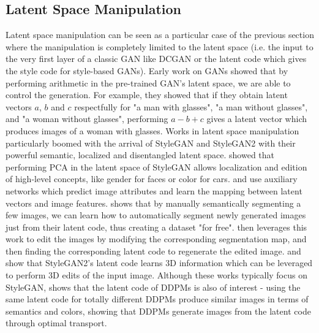 \subsection{Latent Space Manipulation}\label{subsection:latent_space_manipulation}
Latent space manipulation can be seen as a particular case of the previous section where the manipulation 
is completely limited to the latent space (i.e. the input to the very first layer of a classic \ac{GAN}
like \ac{DCGAN} or the latent code which gives the style code for style-based \ac{GAN}s). 
Early work on \ac{GAN}s \citep{dcgan} showed that by performing arithmetic in the pre-trained 
\ac{GAN}'s latent space, we are able to control the generation. For example, they showed that
if they obtain latent vectors $a$, $b$ and $c$ respectfully for "a man with glasses", 
"a man without glasses", and "a woman without glasses", performing $a - b + c$ gives a latent 
vector which produces images of a woman with glasses. Works in latent space manipulation
 particularly boomed with the arrival of StyleGAN \citep{karra2019stylegan}
and StyleGAN2 \citep{karra2020stylegan2} with their powerful semantic, localized and 
disentangled latent space. \cite{harkonen2020ganspace} showed that performing PCA in the 
latent space of 
StyleGAN allows localization and edition of high-level concepts, like gender for faces or 
color for cars. \cite{shen2020interfacegan} and \cite{zhuang2021enjoy} use auxiliary networks 
which predict image attributes and learn the mapping between latent vectors and image features. \cite{zhang2021datasetgan}
shows that by manually semantically segmenting a few images, we can learn how to automatically 
segment newly generated images just from their latent code, thus creating a dataset "for free".
 \cite{ling2021editgan} then leverages this work to edit 
the images by modifying the corresponding segmentation map, and then finding the corresponding latent code to regenerate 
the edited image. \cite{tewari2020stylerig} and \cite{zhang2020image} show that StyleGAN2's latent code 
learns 3D information which can be leveraged to perform 3D edits of the input image. Although 
these works typically focus on StyleGAN, \cite{khrulkov2022understanding} shows that the latent code of 
\ac{DDPM}s is also of interest - using the same latent code for totally different 
\ac{DDPM}s produce similar images in terms of semantics and colors, showing that \ac{DDPM}s generate 
images from the latent code through optimal transport.


